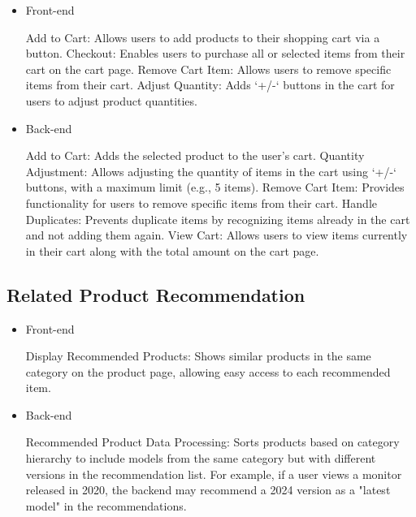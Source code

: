 \documentclass[conference]{IEEEtran}
\begin{document}
\begin{itemize}
\setlength{\parindent}{2ex}
\item Front-end

Add to Cart: Allows users to add products to their shopping cart via a button. \newline\hspace*{1.2ex}
Checkout: Enables users to purchase all or selected items from their cart on the cart page. \newline\hspace*{1.2ex}
Remove Cart Item: Allows users to remove specific items from their cart. \newline\hspace*{1.2ex}
Adjust Quantity: Adds `+/-` buttons in the cart for users to adjust product quantities.

\item Back-end

Add to Cart: Adds the selected product to the user's cart.\newline\hspace*{1.2ex}
Quantity Adjustment: Allows adjusting the quantity of items in the cart using `+/-` buttons, with a maximum limit (e.g., 5 items). \newline\hspace*{1.2ex}
Remove Cart Item: Provides functionality for users to remove specific items from their cart. \newline\hspace*{1.2ex}
Handle Duplicates: Prevents duplicate items by recognizing items already in the cart and not adding them again. \newline\hspace*{1.2ex}
View Cart: Allows users to view items currently in their cart along with the total amount on the cart page.

\end{itemize}

\subsection{Related Product Recommendation}

\begin{itemize}
\setlength{\parindent}{2ex}
\item Front-end

Display Recommended Products: Shows similar products in the same category on the product page, allowing easy access to each recommended item.

\item Back-end

Recommended Product Data Processing: Sorts products based on category hierarchy to include models from the same category but with different versions in the recommendation list. For example, if a user views a monitor released in 2020, the backend may recommend a 2024 version as a "latest model" in the recommendations.

\end{itemize}
\vspace{1cm}
\end{document}
